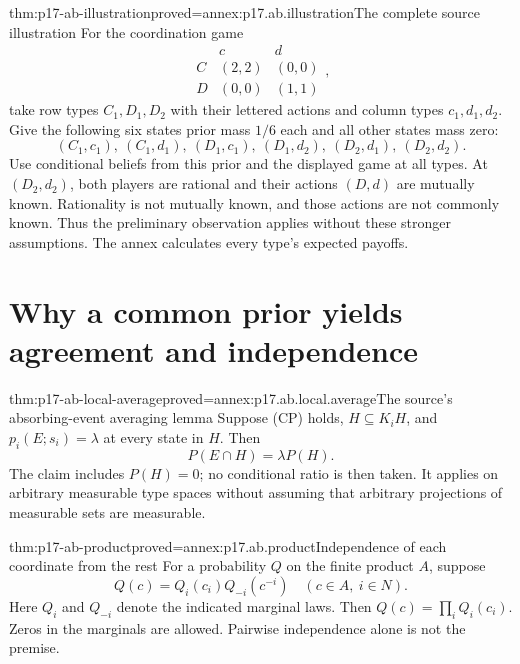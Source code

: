 \begin{hbtheorem}{thm:p17-ab-illustration}{proved=annex:p17.ab.illustration}{The complete source illustration}
For the coordination game
\[
 \begin{array}{c|cc}&c&d\\\hline
 C&(2,2)&(0,0)\\D&(0,0)&(1,1)
 \end{array},
\]
take row types \(C_1,D_1,D_2\) with their lettered actions and
column types \(c_1,d_1,d_2\). Give the following six states prior
mass \(1/6\) each and all other states mass zero:
\[
 (C_1,c_1),\ (C_1,d_1),\ (D_1,c_1),\
 (D_1,d_2),\ (D_2,d_1),\ (D_2,d_2).
\]
Use conditional beliefs from this prior and the displayed game at all types.
At \((D_2,d_2)\), both players are rational and their actions
\((D,d)\) are mutually known. Rationality is not mutually known,
and those actions are not commonly known. Thus the preliminary
observation applies without these stronger assumptions. The annex
calculates every type's expected payoffs.
\end{hbtheorem}

\section{Why a common prior yields agreement and independence}

\begin{hblemma}{thm:p17-ab-local-average}{proved=annex:p17.ab.local.average}{The source's absorbing-event averaging lemma}
Suppose (CP) holds, \(H\subseteq K_iH\), and
\(p_i(E;s_i)=\lambda\) at every state in \(H\). Then
\[
                    P(E\cap H)=\lambda P(H).
\]
The claim includes \(P(H)=0\); no conditional ratio is then taken.
It applies on arbitrary measurable type spaces without assuming
that arbitrary projections of measurable sets are measurable.
\end{hblemma}

\begin{hblemma}{thm:p17-ab-product}{proved=annex:p17.ab.product}{Independence of each coordinate from the rest}
For a probability \(Q\) on the finite product \(A\), suppose
\[
                Q(c)=Q_i(c_i)Q_{-i}(c^{-i})
                     \quad(c\in A,\ i\in N).
\]
Here \(Q_i\) and \(Q_{-i}\) denote the indicated marginal laws.
Then \(Q(c)=\prod_iQ_i(c_i)\). Zeros in the marginals are allowed.
Pairwise independence alone is not the premise.
\end{hblemma}

